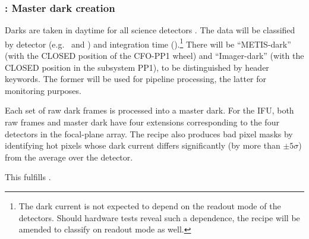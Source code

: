 \clearpage

\subsubsection{: Master dark creation}
\label{sssec:metis_det_dark}
\label{rec:det_dark}
\label{rec:metis_det_dark}

Darks are taken in daytime for all science detectors
\cite{METIS-calibration_plan}. The data will be classified by detector
(e.g.~ and ) and integration time
().\footnote{The dark current is not expected to depend on the readout mode of the detectors. Should hardware tests reveal such a dependence, the recipe will be amended to classify on readout mode as well.} There will be ``METIS-dark''
(with the CLOSED position of the CFO-PP1 wheel) and ``Imager-dark''
(with the CLOSED position in the subsystem PP1), to be distinguished
by header keywords.
The former will be used for pipeline processing, the  latter for monitoring purposes.

Each set of raw dark frames is processed into a master dark. For the
IFU, both raw frames and master dark have four extensions
corresponding to the four detectors in the focal-plane array. The
recipe also produces bad pixel masks by identifying hot pixels whose
dark current differs significantly (by more than $\pm 5\sigma$) from
the average over the detector.

This fulfills .

